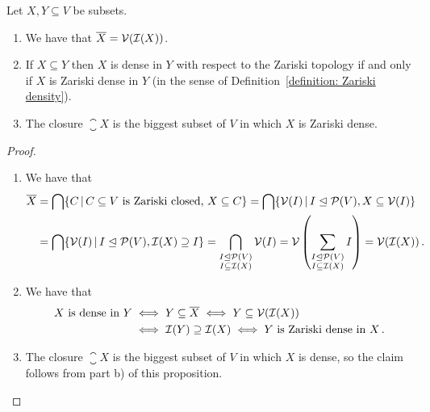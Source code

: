 \begin{proposition}
  \label{proposition: characterization of Zariski closed and Zariski dense}
  Let $X, Y \subseteq V$ be subsets.
  \begin{enumerate}
    \item
      We have that $\overline{X} = \mathcal{V}(\mathcal{I}(X))$.
    \item
      If $X \subseteq Y$ then $X$ is dense in $Y$ with respect to the Zariski topology if and only if $X$ is Zariski dense in $Y$ (in the sense of Definition~\ref{definition: Zariski density}).
    \item
      The closure $\closure{X}$ is the biggest subset of $V$ in which $X$ is Zariski dense.
  \end{enumerate}
\end{proposition}


\begin{proof}
  \leavevmode
  \begin{enumerate}
    \item
      We have that
      \begin{align*}
            \closure{X}
        &=  \bigcap \{ C \suchthat \text{$C \subseteq V$ is Zariski closed, $X \subseteq C$} \}
         =  \bigcap \{ \mc{V}(I) \suchthat I \idealeq \mc{P}(V), X \subseteq \mc{V}(I) \} \\
        &=  \bigcap \{ \mc{V}(I) \suchthat I \idealeq \mc{P}(V), \mc{I}(X) \supseteq I \}
         =  \bigcap_{\substack{I \idealeq \mc{P}(V) \\ I \subseteq \mc{I}(X)}} \mc{V}(I)
         =  \mc{V}\left( \sum_{\substack{I \idealeq \mc{P}(V) \\ I \subseteq \mc{I}(X)}} I \right)
         =  \mc{V}(\mc{I}(X)) \,.
      \end{align*}
    \item
      We have that
      \begin{align*}
              \text{$X$ is dense in $Y$}
        &\iff Y \subseteq \overline{X}
         \iff Y \subseteq \mathcal{V}(\mathcal{I}(X)) \\
        &\iff \mathcal{I}(Y) \supseteq \mathcal{I}(X)
         \iff \text{$Y$ is Zariski dense in $X$} \,.
      \end{align*}
    \item
      The closure $\closure{X}$ is the biggest subset of $V$ in which $X$ is dense, so the claim follows from part b) of this proposition.
    \qedhere
  \end{enumerate}
\end{proof}


